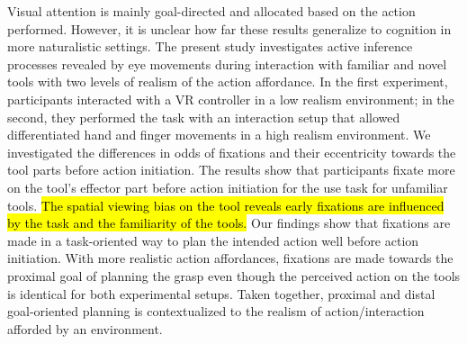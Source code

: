 Visual attention is mainly goal-directed and allocated based on the action performed. However, it is unclear how far these results generalize to cognition in more naturalistic settings. The present study investigates active inference processes revealed by eye movements during interaction with familiar and novel tools with two levels of realism of the action affordance. In the first experiment, participants interacted with a VR controller in a low realism environment; in the second, they performed the task with an interaction setup that allowed differentiated hand and finger movements in a high realism environment. We investigated the differences in odds of fixations and their eccentricity towards the tool parts before action initiation. The results show that participants fixate more on the tool’s effector part before action initiation for the use task for unfamiliar tools. \hl{The spatial viewing bias on the tool reveals early fixations are influenced by the task and the familiarity of the tools.} Our findings show that fixations are made in a task-oriented way to plan the intended action well before action initiation. With more realistic action affordances, fixations are made towards the proximal goal of planning the grasp even though the perceived action on the tools is identical for both experimental setups. Taken together, proximal and distal goal-oriented planning is contextualized to the realism of action/interaction afforded by an environment.


